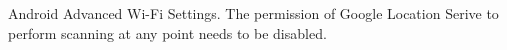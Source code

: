 Android Advanced Wi-Fi Settings. The permission of Google Location Serive to perform scanning at any point needs to be disabled.
